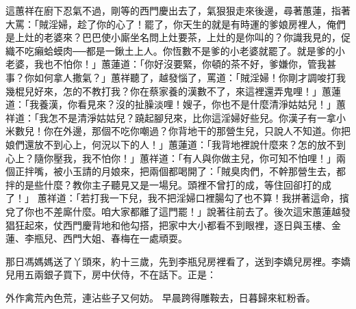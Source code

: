 \begin{showcontents}{}
這蕙祥在廚下忍氣不過，剛等的西門慶出去了，氣狠狠走來後邊，尋著蕙蓮，指著大罵：「賊淫婦，趁了你的心了！罷了，你天生的就是有時運的爹娘房裡人，俺們是上灶的老婆來？巴巴使小廝坐名問上灶要茶，上灶的是你叫的？你識我見的，促織不吃癩蛤蟆肉──都是一鍬土上人。你恆數不是爹的小老婆就罷了。就是爹的小老婆，我也不怕你！」蕙蓮道：「你好沒要緊，你頓的茶不好，爹嫌你，管我甚事？你如何拿人撒氣？」蕙祥聽了，越發惱了，罵道：「賊淫婦！你剛才調唆打我幾棍兒好來，怎的不教打我？你在蔡家養的漢數不了，來這裡還弄鬼哩！」蕙蓮道：「我養漢，你看見來？沒的扯臊淡哩！嫂子，你也不是什麼清淨姑姑兒！」蕙祥道：「我怎不是清淨姑姑兒？蹺起腳兒來，比你這淫婦好些兒。你漢子有一拿小米數兒！你在外邊，那個不吃你嘲過？你背地干的那營生兒，只說人不知道。你把娘們還放不到心上，何況以下的人！」蕙蓮道：「我背地裡說什麼來？怎的放不到心上？隨你壓我，我不怕你！」蕙祥道：「有人與你做主兒，你可知不怕哩！」兩個正拌嘴，被小玉請的月娘來，把兩個都喝開了：「賊臭肉們，不幹那營生去，都拌的是些什麼？教你主子聽見又是一場兒。頭裡不曾打的成，等住回卻打的成了！」 蕙祥道：「若打我一下兒，我不把淫婦口裡腸勾了也不算！我拼著這命，擯兌了你也不差廝什麼。咱大家都離了這門罷！」說著往前去了。後次這宋蕙蓮越發猖狂起來，仗西門慶背地和他勾搭，把家中大小都看不到眼裡，逐日與玉樓、金蓮、李瓶兒、西門大姐、春梅在一處頑耍。

那日馮媽媽送了丫頭來，約十三歲，先到李瓶兒房裡看了，送到李嬌兒房裡。李嬌兒用五兩銀子買下，房中伏侍，不在話下。正是：

外作禽荒內色荒，連沾些子又何妨。
早晨跨得雕鞍去，日暮歸來紅粉香。



\end{showcontents}


